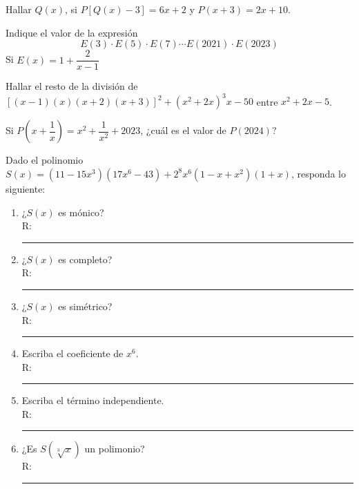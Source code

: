 \begin{section-problem}
    Hallar $Q(x)$, si $P\left[Q(x) - 3\right] = 6x + 2$ y $P(x + 3) = 2x + 10$.
\end{section-problem}

\begin{section-problem}
    Indique el valor de la expresión
    \[E(3)  \cdot E(5) \cdot E(7) \cdots E(2021) \cdot E(2023)\]
    Si $E(x) = 1 + \dfrac{2}{x - 1}$
\end{section-problem}

\begin{section-problem}
    Hallar el resto de la división de $\left[(x - 1)(x)(x + 2)(x + 3)\right]^2 + (x^2 + 2x)^3 x - 50$ entre $x^2 + 2x - 5$.
\end{section-problem}

\begin{section-problem}
    Si $P\left(x + \dfrac{1}{x}\right) = x^2 + \dfrac{1}{x^2} + 2023$, ¿cuál es el valor de $P(2024)$?
\end{section-problem}

\begin{section-problem}
    Dado el polinomio $S(x) = (11 - 15x^3)(17x^6 - 43) + 2^8 x^6 (1 - x + x^2)(1 + x)$, responda lo siguiente:
    \begin{multicols}{2}
        \begin{enumerate}
            \item ¿$S(x)$ es mónico? \\R: \rule{1cm}{0.1mm}
            \item ¿$S(x)$ es completo? \\R: \rule{1cm}{0.1mm}
            \item ¿$S(x)$ es simétrico? \\R: \rule{1cm}{0.1mm}
            \item Escriba el coeficiente de $x^6$. \\R: \rule{1cm}{0.1mm}
            \item Escriba el término independiente.\\ R: \rule{1cm}{0.1mm}
            \item ¿Es $S(\sqrt[3]{x})$ un polimonio? \\ R: \rule{2cm}{0.1mm}
        \end{enumerate}
    \end{multicols}
\end{section-problem}

